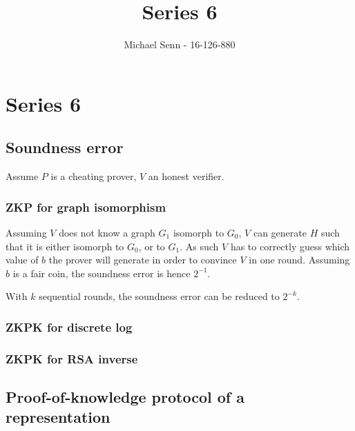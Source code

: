 \documentclass[a4paper]{scrreprt}
\title{Series 6}
\author{Michael Senn \maillink{michael.senn@students.unibe.ch} - 16-126-880}
\date{\printdate}
\begin{document}
\maketitle


\setcounter{chapter}{5}

\chapter{Series 6}

\section{Soundness error}

Assume $P$ is a cheating prover, $V$ an honest verifier.

\subsection{ZKP for graph isomorphism}

Assuming $V$ does not know a graph $G_1$ isomorph to $G_0$, $V$ can generate
$H$ such that it is either isomorph to $G_0$, or to $G_1$. As such $V$ has to
correctly guess which value of $b$ the prover will generate in order to
convince $V$ in one round. Assuming $b$ is a fair coin, the soundness error is
hence $2^{-1}$.

With $k$ sequential rounds, the soundness error can be reduced to $2^{-k}$.

\subsection{ZKPK for discrete log}

% 

\subsection{ZKPK for RSA inverse}

\section{Proof-of-knowledge protocol of a representation}
\end{document}
